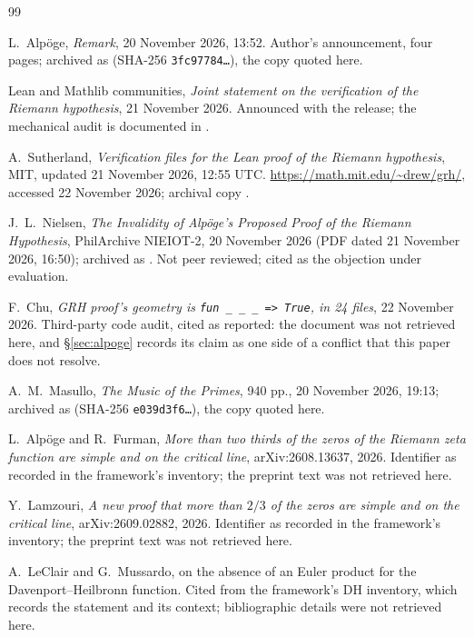\documentclass[11pt,a4paper]{article}
\begin{document}
\begin{thebibliography}{99}

 L.~Alp\"oge, \emph{Remark}, 20 November 2026, 13:52. Author's announcement,
four pages; archived as  (SHA-256
\texttt{3fc97784\ldots}), the copy quoted here.

 Lean and Mathlib communities, \emph{Joint statement on the verification of
  the Riemann hypothesis}, 21 November 2026. Announced with the release; the mechanical audit is
  documented in \cite{sutherland}.

 A.~Sutherland, \emph{Verification files for the Lean proof of the Riemann
  hypothesis}, MIT, updated 21 November 2026, 12:55 UTC. \url{https://math.mit.edu/~drew/grh/},
  accessed 22 November 2026; archival copy .

 J.~L.~Nielsen, \emph{The Invalidity of Alp\"oge's Proposed Proof of the
  Riemann Hypothesis}, PhilArchive NIEIOT-2, 20 November 2026 (PDF dated 21 November 2026, 16:50);
  archived as . Not peer reviewed; cited as the
  objection under evaluation.

 F.~Chu, \emph{GRH proof's geometry is \texttt{fun \_ \_ \_ => True}, in 24
  files}, 22 November 2026. Third-party code audit, cited as reported: the document was not
  retrieved here, and \S\ref{sec:alpoge} records its claim as one side of a conflict that this
  paper does not resolve.

 A.~M.~Masullo, \emph{The Music of the Primes}, 940 pp., 20 November 2026,
  19:13; archived as  (SHA-256
  \texttt{e039d3f6\ldots}), the copy quoted here.

 L.~Alp\"oge and R.~Furman, \emph{More than two thirds of the zeros of
  the Riemann zeta function are simple and on the critical line}, arXiv:2608.13637, 2026. Identifier
  as recorded in the framework's inventory; the preprint text was not retrieved here.

 Y.~Lamzouri, \emph{A new proof that more than $2/3$ of the zeros are simple
  and on the critical line}, arXiv:2609.02882, 2026. Identifier as recorded in the framework's
  inventory; the preprint text was not retrieved here.

 A.~LeClair and G.~Mussardo, on the absence of an Euler product for the
  Davenport--Heilbronn function. Cited from the framework's DH inventory, which records the statement
  and its context; bibliographic details were not retrieved here.


\end{thebibliography}
\end{document}
